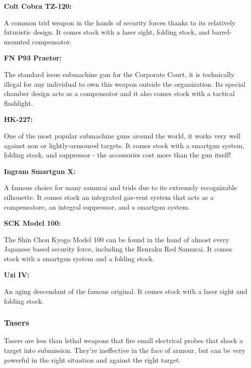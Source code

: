 \begin{mdframed}[linewidth=0pt]
\begin{multicols}{2}
	
	\textbf{Colt Cobra TZ-120:}
	
	A common trid weapon in the hands of security forces thanks to its relatively futuristic design. It comes stock with a laser sight, folding stock, and barrel-mounted compensator.
	
	\textbf{FN P93 Praetor:}

	The standard issue submachine gun for the Corporate Court, it is technically illegal for any individual to own this weapon outside the organization. Its special chamber design acts as a compensator and it also comes stock with a tactical flashlight. 
	
	\textbf{HK-227:}
	
	One of the most popular submachine guns around the world, it works very well against non or lightly-armoured targets. It comes stock with a smartgun system, folding stock, and suppressor - the accessories cost more than the gun itself!
	
	\textbf{Ingram Smartgun X:}
	
	A famous choice for many samurai and trids due to its extremely recognizable silhouette. It comes stock an integrated gas-vent system that acts as a compensatore, an integral suppressor, and a smartgun system.
	
	\textbf{SCK Model 100:}
	
	The Shin Chou Kyogo Model 100 can be found in the hand of almost every Japanese based security force, including the Renraku Red Samurai. It comes stock with a smartgun system and a folding stock.
	
	\textbf{Uzi IV:}
	
	An aging descendant of the famous original. It comes stock with a laser sight and folding stock.
	
\end{multicols}
\end{mdframed}

\subsubsection{Tasers}

Tasers are less than lethal weapons that fire small electrical probes that shock a target into submission. They're ineffective in the face of armour, but can be very powerful in the right situation and against the right target.

